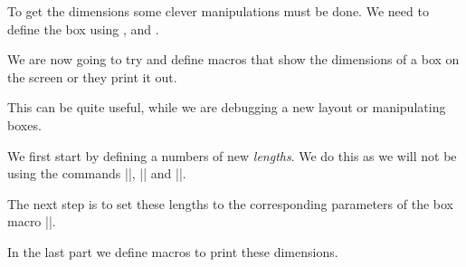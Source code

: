 \begin{fullwidth}
\newsavebox{\Abox}
\savebox{\Abox}{\parbox{2in}{\lorem}}
\usebox{\Abox} \hspace{0.6cm} \usebox{\Abox}
\end{fullwidth}


\bigskip

To get the dimensions some clever manipulations must be done. We need to define the box using ,  and .


\newcommand*{\settoboxwidth}[2]{\setlength{#1}{\wd#2}}

\newsavebox{\mybox}
\newlength{\mylength}
\settoboxwidth{\mylength}{\mybox}

\usebox\mybox

\the\mybox  

\the\wd\mybox

\the\ht\mybox

\medskip

We are now going to try and define macros that show the dimensions of a box on the screen or they print it out.

This can be quite useful, while we are debugging a new layout or manipulating boxes.

We first start by defining a numbers of new \emph{lengths}. We do this as we will not be using the \tex commands
|\wd|, |\ht| and |\dp|.

\begin{teX}
\newlength{\myhh}
\newlength{\mydd}
\newlength{\myww}
\end{teX}

The next step is to set these lengths to the corresponding parameters of the box macro |\Abox|.

\begin{teX}
\settoheight{\myhh}{\usebox{\Abox}}
\settodepth{\mydd}{\usebox{\Abox}}
\settowidth{\myww}{\usebox{\Abox}} 
\end{teX}

In the last part we define macros to print these dimensions.

\begin{teX}
\newcommand{\showboxheight}[1]{
   \settoheight{\myhh}{\usebox{#1}}
   \the\myhh
}


\newcommand{\showboxdepth}[1]{
   \settodepth{\myhh}{\usebox{#1}}
   \the\mydd
}

\newcommand{\showboxwidth}[1]{
   \settodepth{\myhh}{\usebox{#1}}
   \the\myww
}
\end{teX}



